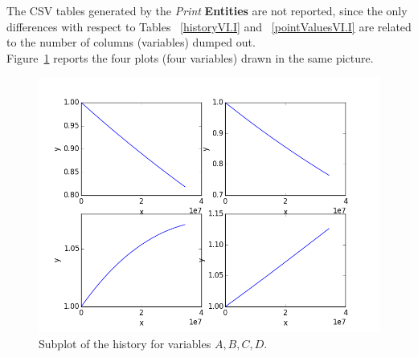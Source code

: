 The CSV tables generated by the \textit{Print} \textbf{Entities} are not reported, since the only differences with respect to Tables ~\ref{historyVI.I} and ~\ref{pointValuesVI.I} are related to the number of columns (variables)
dumped out. 
\\Figure~\ref{fig:historySubPlotLine} reports the four plots (four variables) drawn in the same picture. 
 \begin{figure}[h!]
  \centering
  \includegraphics[scale=0.7]{pics/1-historyPlot_line-line-line-line-subPlots.png}
  \caption{Subplot of the history for variables $A,B,C,D$.}
  \label{fig:historySubPlotLine}
 \end{figure}

